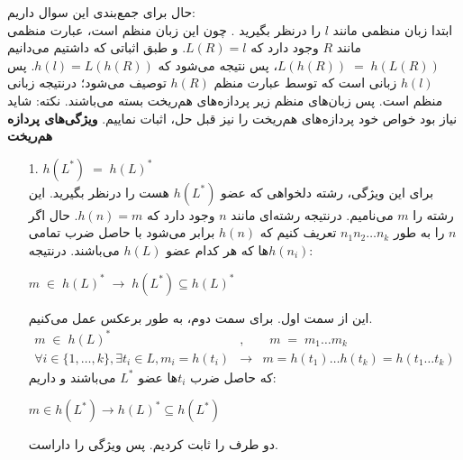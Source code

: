 حال برای جمع‌بندی این سوال داریم:\\[0.15in]
ابتدا زبان منظمی مانند $l$ را درنظر بگیرید . چون این زبان منظم است،
عبارت منظمی مانند $R$ وجود دارد که 
$L(R) = l$.
و طبق اثباتی که داشتیم می‌دانیم 
$L(h(R)) \;=\; h(L(R))$، پس نتیجه می‌شود که 
$h(l) = L(h(R))$.
\newline
پس $h(l)$ زبانی است که توسط عبارت منظم $h(R)$ توصیف می‌شود؛ درنتیجه زبانی منظم است.
پس زبان‌های منظم زیر پردازه‌های هم‌ریخت بسته می‌باشند.\newline\newline
نکته: شاید نیاز بود خواص خود پردازه‌های هم‌ریخت را نیز قبل حل، اثبات نماییم.
\newline\newline
\textbf{ویژگی‌های پردازه هم‌ریخت}
\begin{itemize}
    \item[1. ] $h(L^*) \;=\; h(L)^*$\\[0.1in]
    برای  این ویژگی، رشته دلخواهی که عضو $h(L^*)$ هست را درنظر بگیرید.
    این رشته را $m$ می‌نامیم. درنتیجه رشته‌ای مانند $n$ وجود دارد که
    $h(n) = m$.
    حال اگر $n$ را به طور $n_1n_2\ldots n_k$ تعریف کنیم که $h(n)$ برابر می‌شود با حاصل ضرب تمامی $h(n_i)$ها که هر کدام عضو $h(L)$ می‌باشند. درنتیجه:
    \begin{center}
        $m\;\in\;h(L)^*\;  \rightarrow \; h(L^*) \subseteq h(L)^*$
        \\[0.1in]
    \end{center}
    این از سمت اول. برای سمت دوم، به طور برعکس عمل می‌کنیم.
    \begin{eqnarray*}
        m\;\in \; h(L)^*&,& \;\; m\;=\;m_1\ldots m_k\\
        \forall i\in \{1,\ldots,k\},\exists t_i\in L,
        m_i = h(t_i) &\rightarrow& m=h(t_1)\ldots h(t_k) = h(t_1\ldots t_k)
    \end{eqnarray*}
    که حاصل ضرب $t_i$ها عضو $L^*$ می‌باشند و داریم:
    \begin{center}
        $m\in h(L^*) \rightarrow h(L)^* \subseteq h(L^*)$
    \end{center}
    دو طرف را ثابت کردیم. پس ویژگی را داراست.
    \\[0.1in]
    

\end{itemize}
